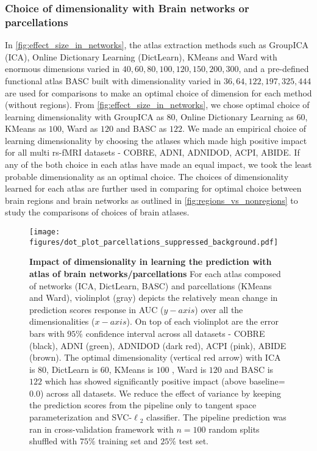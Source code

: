 \documentclass[5p]{elsarticle}
\begin{document}
\subsubsection{Choice of dimensionality with Brain networks or parcellations}
%
In \autoref{fig:effect_size_in_networks}, the
atlas extraction methods such as GroupICA (ICA), Online Dictionary
Learning (DictLearn), KMeans and Ward with enormous dimensions varied in ${40, 60,
80, 100, 120, 150, 200, 300}$, and a pre-defined functional atlas BASC built with
dimensionality varied in ${36, 64, 122, 197, 325, 444}$ are used for
comparisons to make an optimal choice of dimension for each method (without
regions). From
\autoref{fig:effect_size_in_networks}, we chose optimal choice of
learning dimensionality with GroupICA as $80$, Online Dictionary Learning as
$60$, KMeans as $100$, Ward as $120$ and BASC as $122$. We made an empirical
choice of learning dimensionality by choosing the atlases which made high
positive impact
for all multi rs-fMRI datasets - COBRE, ADNI, ADNIDOD, ACPI, ABIDE. If any of the
both choice in each atlas have made an equal impact, we took the least
probable dimensionality as an optimal choice.
The choices of dimensionality learned for each atlas are further
used in comparing
for optimal choice between brain regions and brain networks as outlined in
\autoref{fig:regions_vs_nonregions} to study the comparisons of choices of
brain atlases.
\begin{figure}
    \centerline{%
	\texttt{[image: figures/dot\_plot\_parcellations\_suppressed\_background.pdf]}%
    }%
    \caption[]{\textbf{Impact of dimensionality in learning the prediction
            with atlas of brain networks/parcellations}
            For each atlas composed of networks (ICA, DictLearn, BASC)
             and parcellations (KMeans and Ward), violinplot (gray)
             depicts the relatively mean change in prediction
            scores response in AUC ($y-axis$) over all the dimensionalities
            ($x-axis$). On top of each violinplot are the error bars with
            $95\%$ confidence interval across all datasets - COBRE (black),
            ADNI (green), ADNIDOD (dark red), ACPI (pink), ABIDE (brown).
            The optimal dimensionality (vertical red arrow) with
            ICA is $80$, DictLearn is $60$,
            KMeans is $100$ , Ward is $120$ and BASC is $122$ which has
            showed significantly
            positive impact (above baseline=$0.0$) across all datasets. We
            reduce the effect of variance by keeping the prediction scores
            from the pipeline only to tangent space parameterization and
            SVC-$\ell{_2}$ classifier. The pipeline prediction was ran in
            cross-validation framework with $n=100$ random splits shuffled with
            $75\%$ training set and $25\%$ test set.}
    \label{fig:effect_size_in_networks}
\end{figure}
\end{document}
